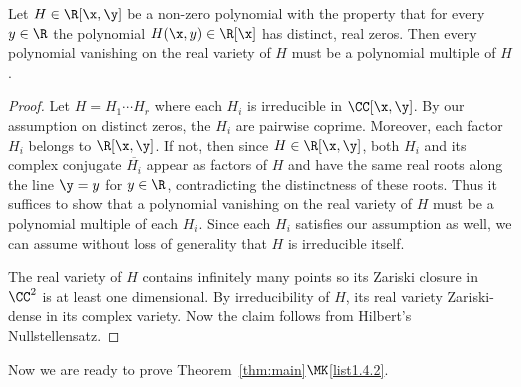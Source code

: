 \begin{lemm}\label{lem:zard}
Let $H\in\R[\x,\y]$ be a non-zero polynomial with the property that for every $y\in\R$ the polynomial $H(\x,y)\in\R[\x]$ has distinct, real zeros. Then every polynomial vanishing on the real variety of $H$ must be a polynomial multiple of $H$.
\end{lemm}

\begin{proof}
Let $H=H_1\cdots H_r$ where each $H_i$ is irreducible in $\CC[\x,\y]$. By our \linebreak assumption on distinct zeros, the $H_i$ are pairwise coprime. Moreover, each factor $H_i$ belongs to $\R[\x,\y]$. If not, then since $H\in \R[\x,\y]$, both $H_i$ and its complex conjugate $\overline{H_i}$ appear as factors of $H$ and have the same real roots along the line $\y = y$ for $y\in \R$, contradicting the distinctness of these roots. Thus it suffices to show that a polynomial vanishing on the real variety of $H$ must be a polynomial multiple of each $H_i$. Since each $H_i$ satisfies our assumption as well, we can assume without loss of generality that $H$ is irreducible itself.

The real variety of $H$ contains infinitely many points so its Zariski closure in $\CC^2$ is at least one dimensional. By irreducibility of $H$, its real variety Zariski-dense in its complex variety. Now the claim follows from Hilbert's Nullstellensatz.
\end{proof}

Now we are ready to prove Theorem~\ref{thm:main}$\MK$\eqref{list1.4.2}.


